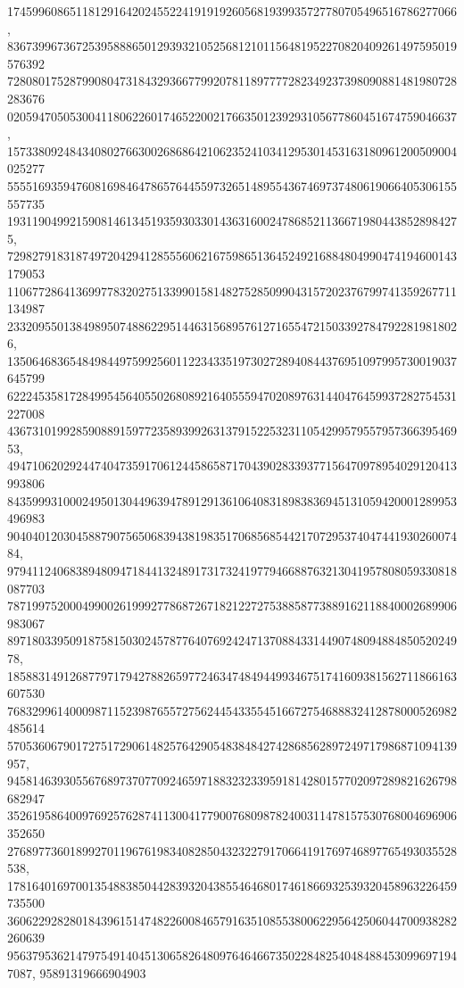 \documentclass[12pt]{article}
\begin{document}
174599608651181291642024552241919192605681939935727780705496516786277066, 
836739967367253958886501293932105256812101156481952270820409261497595019576392
728080175287990804731843293667799207811897777282349237398090881481980728283676
020594705053004118062260174652200217663501239293105677860451674759046637, 
157338092484340802766300268686421062352410341295301453163180961200509004025277
555516935947608169846478657644559732651489554367469737480619066405306155557735
1931190499215908146134519359303301436316002478685211366719804438528984275, 
729827918318749720429412855560621675986513645249216884804990474194600143179053
110677286413699778320275133990158148275285099043157202376799741359267711134987
2332095501384989507488622951446315689576127165547215033927847922819818026, 
135064683654849844975992560112234335197302728940844376951097995730019037645799
622245358172849954564055026808921640555947020897631440476459937282754531227008
43673101992859088915977235893992631379152253231105429957955795736639546953, 
494710620292447404735917061244586587170439028339377156470978954029120413993806
843599931000249501304496394789129136106408318983836945131059420001289953496983
90404012030458879075650683943819835170685685442170729537404744193026007484, 
979411240683894809471844132489173173241977946688763213041957808059330818087703
787199752000499002619992778687267182122727538858773889162118840002689906983067
89718033950918758150302457877640769242471370884331449074809488485052024978, 
185883149126877971794278826597724634748494499346751741609381562711866163607530
768329961400098711523987655727562445433554516672754688832412878000526982485614
570536067901727517290614825764290548384842742868562897249717986871094139957, 
945814639305567689737077092465971883232339591814280157702097289821626798682947
352619586400976925762874113004177900768098782400311478157530768004696906352650
276897736018992701196761983408285043232279170664191769746897765493035528538, 
178164016970013548838504428393204385546468017461866932539320458963226459735500
360622928280184396151474822600846579163510855380062295642506044700938282260639
9563795362147975491404513065826480976464667350228482540484884530996971947087, 
95891319666904903
\end{document}
